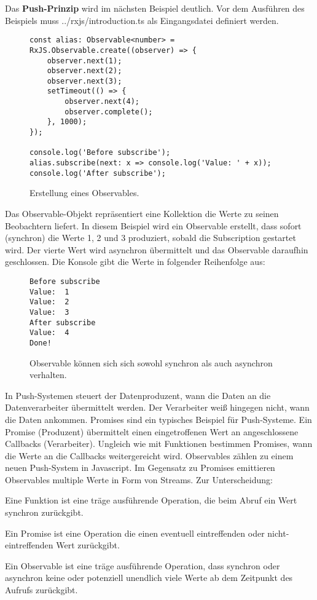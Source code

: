 \noindent
Das \textbf{Push-Prinzip} wird im nächsten Beispiel deutlich. Vor dem Ausführen des Beispiels muss ../rxjs/introduction.ts als Eingangsdatei definiert werden.

\begin{figure}[H]
\begin{lstlisting}[basicstyle=\small]
const alias: Observable<number> = RxJS.Observable.create((observer) => {
    observer.next(1);
    observer.next(2);
    observer.next(3);
    setTimeout(() => {
        observer.next(4);
        observer.complete();
    }, 1000);
});

console.log('Before subscribe');
alias.subscribe(next: x => console.log('Value: ' + x));
console.log('After subscribe');
\end{lstlisting}
\caption{Erstellung eines Observables.}
\label{creation-of-observable-first-example}
\end{figure}

\noindent
Das Observable-Objekt repräsentiert eine Kollektion die Werte zu seinen Beobachtern liefert. In diesem Beispiel wird ein Observable erstellt, dass sofort (synchron) die Werte 1, 2 und 3 produziert, sobald die Subscription gestartet wird. Der vierte Wert wird asynchron übermittelt und das Observable daraufhin geschlossen. Die Konsole gibt die Werte in folgender Reihenfolge aus:

\begin{figure}[H]
\begin{lstlisting}
Before subscribe
Value:  1
Value:  2
Value:  3
After subscribe
Value:  4
Done!
\end{lstlisting}
\caption{Observable können sich sich sowohl synchron als auch asynchron verhalten.}
\end{figure}

\noindent
In Push-Systemen steuert der Datenproduzent, wann die Daten an die Datenverarbeiter übermittelt werden. Der Verarbeiter weiß hingegen nicht, wann die Daten ankommen. Promises sind ein typisches Beispiel für Push-Systeme. Ein Promise (Produzent) übermittelt einen eingetroffenen Wert an angeschlossene Callbacks (Verarbeiter). Ungleich wie mit Funktionen bestimmen Promises, wann die Werte an die Callbacks weitergereicht wird. Observables zählen zu einem neuen Push-System in Javascript. Im Gegensatz zu Promises emittieren Observables multiple Werte in Form von Streams. Zur Unterscheidung:

\begin{description}
\item Eine Funktion ist eine träge ausführende Operation, die beim Abruf ein Wert synchron zurückgibt.
\item Ein Promise ist eine Operation die einen eventuell eintreffenden oder nicht-eintreffenden Wert zurückgibt.
\item Ein Observable ist eine träge ausführende Operation, dass synchron oder asynchron keine oder potenziell unendlich viele Werte ab dem Zeitpunkt des Aufrufs zurückgibt.
\end{description}

